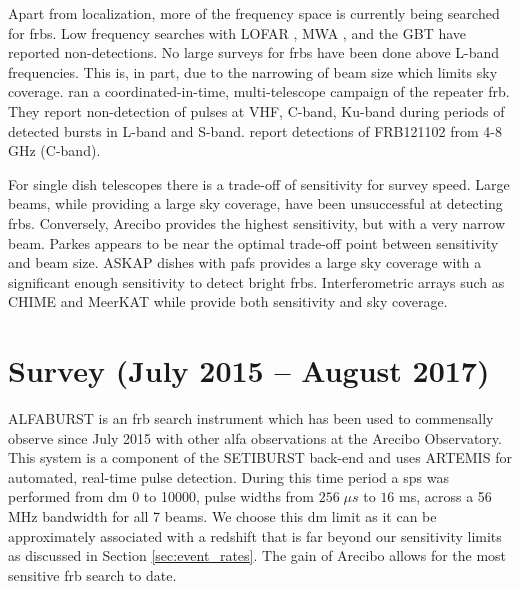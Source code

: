 \documentclass[a4paper,fleqn,usenatbib]{mnras}
\begin{document}
Apart from localization, more of the frequency space is currently being searched for \glspl{frb}. Low
frequency searches with LOFAR \citep{2015MNRAS.452.1254K}, MWA
\citep{2015AJ....150..199T}, and the GBT \citep{2017arXiv170107457C} have
reported non-detections.  No large surveys for \glspl{frb} have been done above
L-band frequencies. This is, in part, due to the narrowing of beam size which
limits sky coverage.  \cite{2017arXiv170507553L} ran a coordinated-in-time,
multi-telescope campaign of the repeater \gls{frb}.  They report non-detection
of pulses at VHF, C-band, Ku-band during periods of detected bursts in L-band
and S-band. \cite{atel10675} report detections of FRB121102 from 4-8 GHz
(C-band).

For single dish telescopes there is a trade-off of sensitivity for survey speed.
Large beams, while providing a large sky coverage, have been unsuccessful at
detecting \glspl{frb}. Conversely, Arecibo provides the highest sensitivity, but
with a very narrow beam. Parkes appears to be near the optimal trade-off point
between sensitivity and beam size. ASKAP dishes with \glspl{paf} provides a
large sky coverage with a significant enough sensitivity to detect bright
\glspl{frb}. Interferometric arrays such as CHIME and MeerKAT while provide both
sensitivity and sky coverage.


\section{Survey (July 2015 -- August 2017)}
\label{sec:overview}

ALFABURST is an \gls{frb} search instrument which has been used to commensally
observe since July 2015 with other \gls{alfa} observations at the Arecibo
Observatory. This system is a component of the SETIBURST back-end
\citep{2017ApJS..228...21C} and uses ARTEMIS \citep{2015MNRAS.452.1254K} for
automated, real-time pulse detection. During this time period a \gls{sps} was
performed from \gls{dm} 0 to 10000, pulse widths from $256 \; \mu s$ to $16$ ms,
across a 56 MHz bandwidth for all 7 beams. We choose this \gls{dm} limit as it
can be approximately associated with a redshift that is far beyond our
sensitivity limits as discussed in Section \ref{sec:event_rates}. The gain of
Arecibo allows for the most sensitive \gls{frb} search to date.
\end{document}
